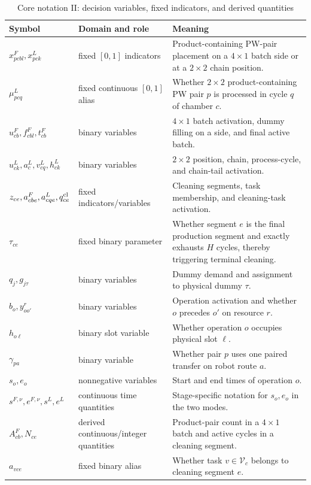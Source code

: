 \documentclass[journal]{IEEEtran}
\begin{document}
\begin{table}[t]
\centering
\footnotesize
\setlength{\tabcolsep}{1pt}
\caption{Core notation II: decision variables, fixed indicators, and derived quantities}
\label{tab:symbol-en-b}
\begin{tabular}{C{0.18\textwidth}C{0.15\textwidth}C{0.47\textwidth}}
\toprule
Symbol & Domain and role & Meaning \\
\midrule
$x^F_{pcbl},x^L_{pck}$ & fixed $[0,1]$ indicators & Product-containing PW-pair placement on a $4\times1$ batch side or at a $2\times2$ chain position.\\
$\mu^L_{pcq}$ & fixed continuous $[0,1]$ alias & Whether $2\times2$ product-containing PW pair $p$ is processed in cycle $q$ of chamber $c$.\\
$u^F_{cb},f^F_{cbl},t^F_{cb}$ & binary variables & $4\times1$ batch activation, dummy filling on a side, and final active batch.\\
$u^L_{ck},a^L_c,v^L_{cq},h^L_{ck}$ & binary variables & $2\times2$ position, chain, process-cycle, and chain-tail activation.\\
$z_{ce},a^F_{cbe},a^L_{cqe},q^{\rm cl}_{ce}$ & fixed indicators/variables & Cleaning segments, task membership, and cleaning-task activation.\\
$\tau_{ce}$ & fixed binary parameter & Whether segment $e$ is the final production segment and exactly exhausts $H$ cycles, thereby triggering terminal cleaning.\\
$q_j,g_{j\tau}$ & binary variables & Dummy demand and assignment to physical dummy $\tau$.\\
$b_o,y^r_{oo'}$ & binary variables & Operation activation and whether $o$ precedes $o'$ on resource $r$.\\
$h_{o\ell}$ & binary slot variable & Whether operation $o$ occupies physical slot $\ell$.\\
$\gamma_{pa}$ & binary variable & Whether pair $p$ uses one paired transfer on robot route $a$.\\
$s_o,e_o$ & nonnegative variables & Start and end times of operation $o$.\\
$s^{F,\nu},e^{F,\nu},s^L,e^L$ & continuous time quantities & Stage-specific notation for $s_o,e_o$ in the two modes.\\
$A^F_{cb},N_{ce}$ & derived continuous/integer quantities & Product-pair count in a $4\times1$ batch and active cycles in a cleaning segment.\\
$a_{vce}$ & fixed binary alias & Whether task $v\in\mathcal V_c$ belongs to cleaning segment $e$.\\

\end{tabular}
\end{table}
\end{document}
